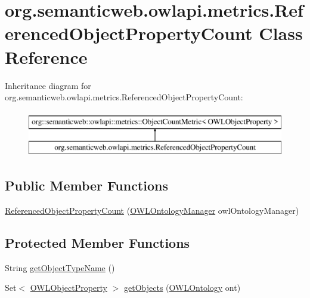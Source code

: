 \hypertarget{classorg_1_1semanticweb_1_1owlapi_1_1metrics_1_1_referenced_object_property_count}{\section{org.\-semanticweb.\-owlapi.\-metrics.\-Referenced\-Object\-Property\-Count Class Reference}
\label{classorg_1_1semanticweb_1_1owlapi_1_1metrics_1_1_referenced_object_property_count}
}
Inheritance diagram for org.\-semanticweb.\-owlapi.\-metrics.\-Referenced\-Object\-Property\-Count\-:\begin{figure}[H]
\begin{center}
\leavevmode
\includegraphics[height=2.000000cm]{classorg_1_1semanticweb_1_1owlapi_1_1metrics_1_1_referenced_object_property_count}
\end{center}
\end{figure}
\subsection*{Public Member Functions}
\begin{DoxyCompactItemize}
\item 
\hyperlink{classorg_1_1semanticweb_1_1owlapi_1_1metrics_1_1_referenced_object_property_count_a735aab9b6d38862d7bd2ba629dac59f6}{Referenced\-Object\-Property\-Count} (\hyperlink{interfaceorg_1_1semanticweb_1_1owlapi_1_1model_1_1_o_w_l_ontology_manager}{O\-W\-L\-Ontology\-Manager} owl\-Ontology\-Manager)
\end{DoxyCompactItemize}
\subsection*{Protected Member Functions}
\begin{DoxyCompactItemize}
\item 
String \hyperlink{classorg_1_1semanticweb_1_1owlapi_1_1metrics_1_1_referenced_object_property_count_a84a33d3b5cf084fd12d9e3fe93fdf07f}{get\-Object\-Type\-Name} ()
\item 
Set$<$ \hyperlink{interfaceorg_1_1semanticweb_1_1owlapi_1_1model_1_1_o_w_l_object_property}{O\-W\-L\-Object\-Property} $>$ \hyperlink{classorg_1_1semanticweb_1_1owlapi_1_1metrics_1_1_referenced_object_property_count_afcd14b6c4a1022dbd4a711dc409b02d7}{get\-Objects} (\hyperlink{interfaceorg_1_1semanticweb_1_1owlapi_1_1model_1_1_o_w_l_ontology}{O\-W\-L\-Ontology} ont)
\end{DoxyCompactItemize}



